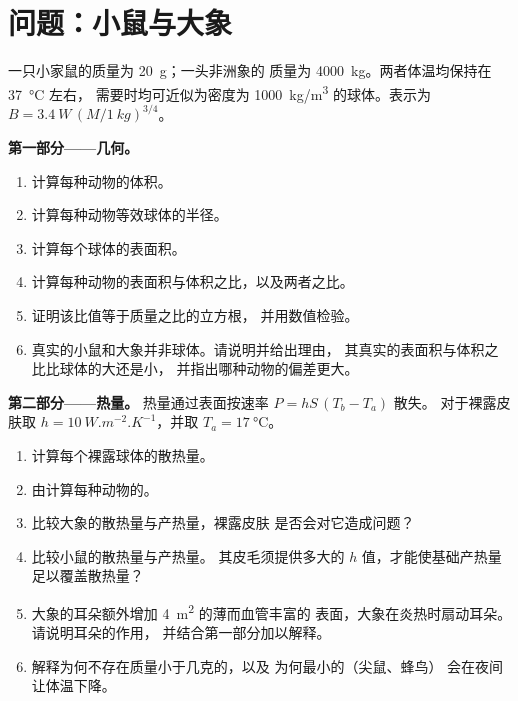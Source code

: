 \section{问题：小鼠与大象}

\begin{problem}
\label{pb:b1:organism-environment:1}
一只小家鼠的质量为 \qty{20}{g}；一头非洲象的
质量为 \qty{4000}{kg}。两者体温均保持在 \qty{37}{\celsius} 左右，
需要时均可近似为密度为
\qty{1000}{kg/m^3} 的球体。表示为 $B = \qty{3.4}{W}\,(M/\qty{1}{kg})^{3/4}$。

\medskip
\noindent\textbf{第一部分——几何。}
\begin{enumerate}
  \item 计算每种动物的体积。
  \item 计算每种动物等效球体的半径。
  \item 计算每个球体的表面积。
  \item 计算每种动物的表面积与体积之比，以及两者之比。
  \item 证明该比值等于质量之比的立方根，
        并用数值检验。
  \item 真实的小鼠和大象并非球体。请说明并给出理由，
        其真实的表面积与体积之比比球体的大还是小，
        并指出哪种动物的偏差更大。
\end{enumerate}

\medskip
\noindent\textbf{第二部分——热量。}
热量通过表面按速率 $P = hS\,(T_b - T_a)$ 散失。
对于裸露皮肤取 $h = \qty{10}{W.m^{-2}.K^{-1}}$，并取 $T_a =
\qty{17}{\celsius}$。
\begin{enumerate}[resume]
  \item 计算每个裸露球体的散热量。
  \item 由计算每种动物的。
  \item 比较大象的散热量与产热量，裸露皮肤
        是否会对它造成问题？
  \item 比较小鼠的散热量与产热量。
        其皮毛须提供多大的 $h$ 值，才能使基础产热量
        足以覆盖散热量？
  \item 大象的耳朵额外增加 \qty{4}{m^2} 的薄而血管丰富的
        表面，大象在炎热时扇动耳朵。请说明耳朵的作用，
        并结合第一部分加以解释。
  \item 解释为何不存在质量小于几克的，以及
        为何最小的（尖鼠、蜂鸟）
        会在夜间让体温下降。
\end{enumerate}


\end{problem}
